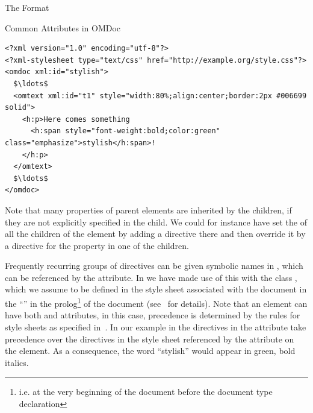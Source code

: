 \begin{omgroup}[creators=miko,id=spec-intro]{The {\omdoc} Format}
\begin{omgroup}[id=common-attribs]{Common Attributes in OMDoc}
\begin{lstlisting}[label=lst:css-basic,mathescape,
   caption={Basic {\css} Directives in a {\attributeshort{style}} Attribute},
   index={style,class}]
<?xml version="1.0" encoding="utf-8"?>
<?xml-stylesheet type="text/css" href="http://example.org/style.css"?>
<omdoc xml:id="stylish">
  $\ldots$
  <omtext xml:id="t1" style="width:80%;align:center;border:2px #006699 solid">
    <h:p>Here comes something 
      <h:span style="font-weight:bold;color:green" class="emphasize">stylish</h:span>!
    </h:p>
  </omtext>
  $\ldots$
</omdoc>
\end{lstlisting}

Note that many {\css} properties of parent elements are inherited by the children,
if they are not explicitly specified in the child. We could for instance have set
the {} of all the children of the {} element
by adding a directive {} there and then override it by
a directive for the property {} in one of the children.

Frequently recurring groups of {\css} directives can be given symbolic names in {\css}
, which can be referenced by the
{} attribute. In {} we have made use of this
with the class {}, which we assume to be defined in the style sheet
{} associated with the document in the ``{}'' in the prolog\footnote{i.e. at the very beginning of
  the {\xml} document before the document type declaration} of the {\xml} document
(see~\cite{Clark:assxd99} for details).  Note that an {\omdoc} element can have both
{} and {} attributes, in this case, precedence
is determined by the rules for {\css} style sheets as specified in~\cite{BosHak:css98}. In
our example in {} the directives in the {}
attribute take precedence over the {\css} directives in the style sheet referenced by the
{} attribute on the {} element. As a consequence,
the word ``stylish'' would appear in green, bold italics.
\end{omgroup}
\end{omgroup}



